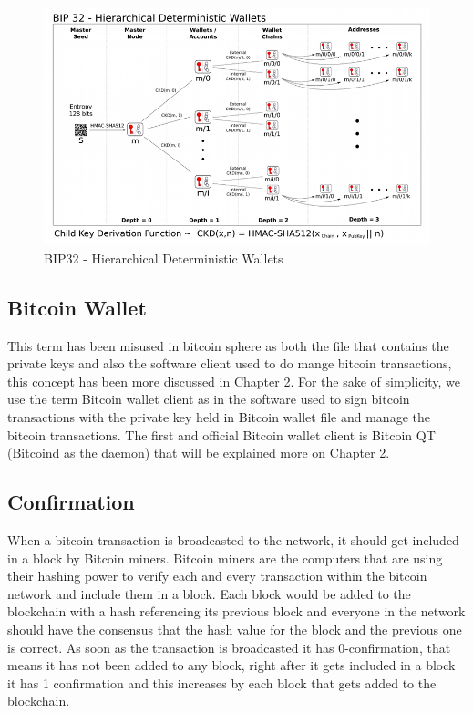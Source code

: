 \begin{figure}
\centering
\includegraphics[width=\linewidth]{fig/bip32derivation.png}
  \caption{BIP32 - Hierarchical Deterministic Wallets}
\label{fig:bip32}
\end{figure}


\subsection{Bitcoin Wallet}
This term has been misused in bitcoin sphere as both the file that contains the private keys and also the software client used to do mange bitcoin transactions, this concept has been more discussed in Chapter 2. For the sake of simplicity, we use the term Bitcoin wallet client as in the software used to sign bitcoin transactions with the private key held in Bitcoin wallet file and manage the bitcoin transactions.
The first and official Bitcoin wallet client is Bitcoin QT (Bitcoind as the daemon) that will be explained more on Chapter 2.



\subsection{Confirmation}
When a bitcoin transaction is broadcasted to the network, it should get included in a block by Bitcoin miners. Bitcoin miners are the computers that are using their hashing power to verify each and every transaction within the bitcoin network and include them in a block. Each block would be added to the blockchain with a hash referencing its previous block and everyone in the network should have the consensus that the hash value for the block and the previous one is correct. As soon as the transaction is broadcasted it has 0-confirmation, that means it has not been added to any block, right after it gets included in a block it has 1 confirmation and this increases by each block that gets added to the blockchain.

